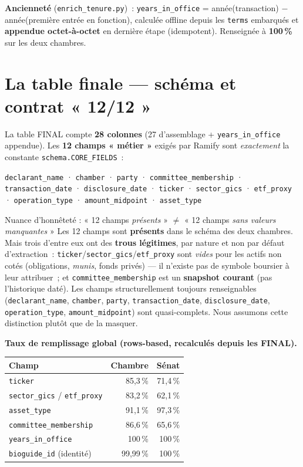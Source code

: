 \documentclass[11pt,a4paper]{article}
\newcommand{\co}[1]{\texttt{\small #1}}
\begin{document}
\textbf{Ancienneté} (\co{enrich_tenure.py})~: \co{years_in_office} = année(transaction)
$-$ année(première entrée en fonction), calculée offline depuis les \co{terms} embarqués et
\textbf{appendue octet-à-octet} en dernière étape (idempotent). Renseignée à \textbf{100\,\%} sur les
deux chambres.

\section{La table finale — schéma et contrat « 12/12 »}
\label{sec:table}

La table FINAL compte \textbf{28 colonnes} (27 d'assemblage + \co{years_in_office} appendue). Les
\textbf{12 champs « métier »} exigés par Ramify sont \emph{exactement} la constante
\co{schema.CORE_FIELDS}~:

\begin{center}\small
\co{declarant_name} · \co{chamber} · \co{party} · \co{committee_membership} · \co{transaction_date} ·
\co{disclosure_date} · \co{ticker} · \co{sector_gics} · \co{etf_proxy} · \co{operation_type} ·
\co{amount_midpoint} · \co{asset_type}
\end{center}

\begin{keybox}{Nuance d'honnêteté : « 12 champs \emph{présents} » $\neq$ « 12 champs \emph{sans valeurs
manquantes} »}
Les 12 champs sont \textbf{présents} dans le schéma des deux chambres. Mais trois d'entre eux ont des
\textbf{trous légitimes}, par nature et non par défaut d'extraction~:
\co{ticker}/\co{sector_gics}/\co{etf_proxy} sont \emph{vides} pour les actifs non cotés (obligations,
\emph{munis}, fonds privés) — il n'existe pas de symbole boursier à leur attribuer~; et
\co{committee_membership} est un \textbf{snapshot courant} (pas l'historique daté). Les champs
structurellement toujours renseignables (\co{declarant_name}, \co{chamber}, \co{party},
\co{transaction_date}, \co{disclosure_date}, \co{operation_type}, \co{amount_midpoint}) sont
quasi-complets. Nous assumons cette distinction plutôt que de la masquer.
\end{keybox}

\textbf{Taux de remplissage global (rows-based, recalculés depuis les FINAL).}
\begin{center}\small
\begin{tabular}{lrr}
\toprule
\bfseries Champ & \bfseries Chambre & \bfseries Sénat\\
\midrule
\co{ticker} & 85,3\,\% & 71,4\,\% \\
\co{sector_gics} / \co{etf_proxy} & 83,2\,\% & 62,1\,\% \\
\co{asset_type} & 91,1\,\% & 97,3\,\% \\
\co{committee_membership} & 86,6\,\% & 65,6\,\% \\
\co{years_in_office} & 100\,\% & 100\,\% \\
\co{bioguide_id} (identité) & 99,99\,\% & 100\,\% \\
\bottomrule
\end{tabular}
\end{center}
\end{document}
